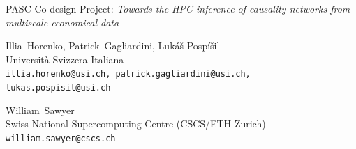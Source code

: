 \documentclass[a0,portrait]{a0poster}
\begin{document}
\begin{center}
\parbox{0.98\textwidth}{
\begin{center}
\LARGE
\sf
PASC Co-design Project:  {\em Towards the HPC-inference of causality networks from multiscale economical data}
\end{center}
}
\end{center}
\begin{center}
\parbox{0.48\textwidth}{
    \small
    \begin{center}
    Illia~Horenko, Patrick~Gagliardini, Luk\'{a}\v{s} Posp\'{i}\v{s}il \\
    Universit\`a Svizzera Italiana \\
    {\tt illia.horenko@usi.ch, patrick.gagliardini@usi.ch, lukas.pospisil@usi.ch}
    \end{center}
}
\parbox{0.48\textwidth}{
    \small
    \begin{center}
    William~Sawyer\\
    Swiss National Supercomputing Centre (CSCS/ETH Zurich) \\
    {\tt william.sawyer@cscs.ch}
    \end{center}
}
\end{center}
\vspace{1cm}
\end{document}
